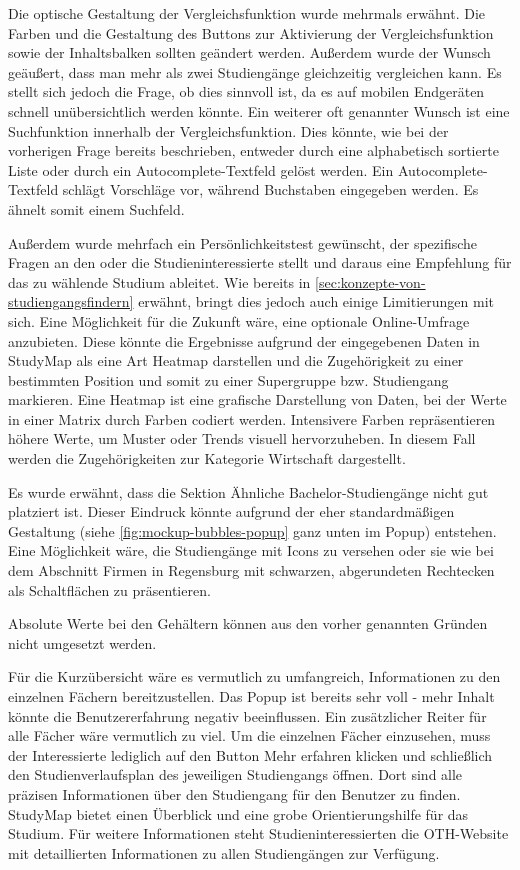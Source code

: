 Die optische Gestaltung der Vergleichsfunktion wurde mehrmals erwähnt. Die Farben und die Gestaltung des Buttons zur Aktivierung der Vergleichsfunktion sowie der Inhaltsbalken sollten geändert werden. Außerdem wurde der Wunsch geäußert, dass man mehr als zwei Studiengänge gleichzeitig vergleichen kann. Es stellt sich jedoch die Frage, ob dies sinnvoll ist, da es auf mobilen Endgeräten schnell unübersichtlich werden könnte. Ein weiterer oft genannter Wunsch ist eine Suchfunktion innerhalb der Vergleichsfunktion. Dies könnte, wie bei der vorherigen Frage bereits beschrieben, entweder durch eine alphabetisch sortierte Liste oder durch ein Autocomplete-Textfeld gelöst werden. Ein Autocomplete-Textfeld schlägt Vorschläge vor, während Buchstaben eingegeben werden. Es ähnelt somit einem Suchfeld.

Außerdem wurde mehrfach ein Persönlichkeitstest gewünscht, der spezifische Fragen an den oder die Studieninteressierte stellt und daraus eine Empfehlung für das zu wählende Studium ableitet. Wie bereits in \autoref{sec:konzepte-von-studiengangsfindern} erwähnt, bringt dies jedoch auch einige Limitierungen mit sich. Eine Möglichkeit für die Zukunft wäre, eine optionale Online-Umfrage anzubieten. Diese könnte die Ergebnisse aufgrund der eingegebenen Daten in StudyMap als eine Art Heatmap darstellen und die Zugehörigkeit zu einer bestimmten Position und somit zu einer Supergruppe bzw. Studiengang markieren. Eine Heatmap ist eine grafische Darstellung von Daten, bei der Werte in einer Matrix durch Farben codiert werden. Intensivere Farben repräsentieren höhere Werte, um Muster oder Trends visuell hervorzuheben. In diesem Fall werden die Zugehörigkeiten zur Kategorie \glqq Wirtschaft\grqq{} dargestellt. 

Es wurde erwähnt, dass die Sektion \glqq Ähnliche Bachelor-Studiengänge\grqq{} nicht gut platziert ist. Dieser Eindruck könnte aufgrund der eher standardmäßigen Gestaltung (siehe \autoref{fig:mockup-bubbles-popup} ganz unten im Popup) entstehen. Eine Möglichkeit wäre, die Studiengänge mit Icons zu versehen oder sie wie bei dem Abschnitt \glqq Firmen in Regensburg\grqq{} mit schwarzen, abgerundeten Rechtecken als Schaltflächen zu präsentieren.

Absolute Werte bei den Gehältern können aus den vorher genannten Gründen nicht umgesetzt werden.

Für die Kurzübersicht wäre es vermutlich zu umfangreich, Informationen zu den einzelnen Fächern bereitzustellen. Das Popup ist bereits sehr voll - mehr Inhalt könnte die Benutzererfahrung negativ beeinflussen. Ein zusätzlicher Reiter für alle Fächer wäre vermutlich zu viel. Um die einzelnen Fächer einzusehen, muss der Interessierte lediglich auf den Button \glqq Mehr erfahren\grqq{} klicken und schließlich den Studienverlaufsplan des jeweiligen Studiengangs öffnen. Dort sind alle präzisen Informationen über den Studiengang für den Benutzer zu finden. StudyMap bietet einen Überblick und eine grobe Orientierungshilfe für das Studium. Für weitere Informationen steht Studieninteressierten die OTH-Website mit detaillierten Informationen zu allen Studiengängen zur Verfügung.

